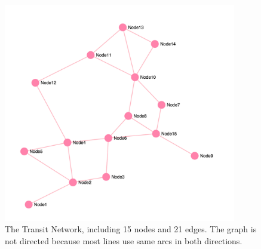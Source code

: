 \begin{figure}[hb]
  \centering
  \includegraphics[width=4in]{assets/mandlnetwork.png}
  \caption[Transit Network]
   {The Transit Network, including 15 nodes and 21 edges. The graph is not directed because most lines use same arcs in both directions.}
\end{figure}

